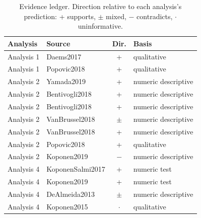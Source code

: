 \begin{table}[htbp]
\centering
\caption{Evidence ledger. Direction relative to each analysis's prediction: + supports, $\pm$ mixed, $-$ contradicts, $\cdot$ uninformative.}
\label{tab:ledger}
\begin{tabular}{llcl}
\toprule
Analysis & Source & Dir. & Basis \\
\midrule
Analysis 1 & Daems2017 & + & qualitative \\
Analysis 1 & Popovic2018 & + & qualitative \\
Analysis 2 & Yamada2019 & + & numeric descriptive \\
Analysis 2 & Bentivogli2018 & + & numeric descriptive \\
Analysis 2 & Bentivogli2018 & + & numeric descriptive \\
Analysis 2 & VanBrussel2018 & $\pm$ & numeric descriptive \\
Analysis 2 & VanBrussel2018 & + & numeric descriptive \\
Analysis 2 & Popovic2018 & + & qualitative \\
Analysis 2 & Koponen2019 & $-$ & numeric descriptive \\
Analysis 4 & KoponenSalmi2017 & + & numeric test \\
Analysis 4 & Koponen2019 & + & numeric test \\
Analysis 4 & DeAlmeida2013 & $\pm$ & numeric descriptive \\
Analysis 4 & Koponen2015 & $\cdot$ & qualitative \\
\bottomrule
\end{tabular}
\end{table}